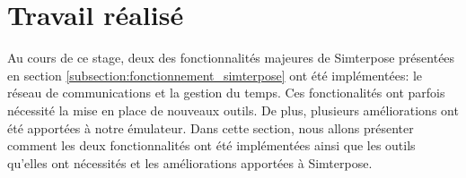 \section{Travail réalisé}
\label{section:work}
Au cours de ce stage, deux des fonctionnalités majeures de Simterpose présentées en section \ref{subsection:fonctionnement_simterpose} ont été implémentées: le réseau de communications et la gestion du temps. Ces fonctionalités ont parfois nécessité la mise en place de nouveaux outils. De plus, plusieurs améliorations ont été apportées à notre émulateur. Dans cette section, nous allons présenter comment les deux fonctionnalités ont été implémentées ainsi que les outils qu'elles ont nécessités et les améliorations apportées à Simterpose.



